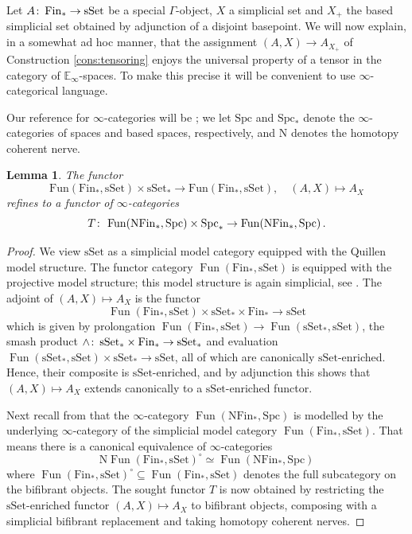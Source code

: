 \documentclass[oneside, a4paper, 12pt]{article}
\numberwithin{equation}{section}
\DeclareMathOperator{\Fun}{Fun}
\newcommand{\Spc}{\mathrm{Spc}}
\newcommand{\Fin}{\mathrm{Fin}}
\newcommand{\sset}{\mathrm{sSet}}
\newcommand{\co}{\colon\thinspace}
\theoremstyle{plain}
\newtheorem{lemma}[theorem]{Lemma}
\theoremstyle{definition}
\theoremstyle{remark}
\begin{document}
Let $A\co \Fin_\ast\to \sset$ be a special $\Gamma$-object, $X$ a simplicial set and $X_+$ the based simplicial set obtained by adjunction of a disjoint basepoint. We will now explain, in a somewhat ad hoc manner, that the assignment $(A,X)\to A_{X_+}$ of Construction \ref{cons:tensoring} enjoys the universal property of a tensor in the category of $\mathbb{E}_\infty$-spaces. To make this precise it will be convenient to use $\infty$-categorical language.

Our reference for $\infty$-categories will be \cite{HTT}; we let $\Spc$ and $\Spc_\ast$ denote the $\infty$-categories of spaces and based spaces, respectively, and $\mathrm{N}$ denotes the homotopy coherent nerve.

\begin{lemma}
The functor
\[
\mathrm{Fun}(\Fin_\ast,\sset) \times \sset_\ast\to \mathrm{Fun}(\Fin_\ast,\sset),\quad (A,X)\mapsto A_X
\]
refines to a functor of $\infty$-categories
\[
T\co \Fun(\mathrm{N}\Fin_\ast,\Spc) \times \Spc_\ast \to \Fun(\mathrm{N}\Fin_\ast,\Spc)\, .
\]
\end{lemma}
\begin{proof}
We view $\sset$ as a simplicial model category equipped with the Quillen model structure. The functor category $\Fun(\Fin_\ast,\sset)$ is equipped with the projective model structure; this model structure is again simplicial, see \cite[Section A.3.3]{HTT}. The adjoint of $(A,X)\mapsto A_X$ is the functor
\[
\Fun(\Fin_\ast,\sset)\times \sset_\ast \times \Fin_\ast  \to \sset
\]
which is given by prolongation $\Fun(\Fin_\ast,\sset)\to \Fun(\sset_\ast,\sset)$, the smash product $\wedge\co \sset_\ast \times \Fin_\ast\to \sset_\ast$ and evaluation $\Fun(\sset_\ast,\sset)\times \sset_\ast\to \sset$, all of which are canonically $\sset$-enriched. Hence, their composite is $\sset$-enriched, and by adjunction this shows that $(A,X)\mapsto A_X$ extends canonically to a $\sset$-enriched functor.

Next recall from \cite[4.2.4.4]{HTT} that the $\infty$-category $\Fun(\mathrm{N}\Fin_\ast,\Spc)$ is modelled by the underlying $\infty$-category of the simplicial model category $ \Fun(\Fin_\ast,\sset)$. That means there is a canonical equivalence of $\infty$-categories
\begin{equation} \label{eq:functorcategory}
\mathrm{N} \Fun(\Fin_\ast,\sset)^{\circ}\simeq \Fun(\mathrm{N}\Fin_\ast,\Spc)
\end{equation}
where $\Fun(\Fin_\ast,\sset)^{\circ}\subseteq \Fun(\Fin_\ast,\sset)$ denotes the full subcategory on the bifibrant objects. The sought functor $T$ is now obtained by restricting the $\sset$-enriched functor $(A,X)\mapsto A_X$ to bifibrant objects, composing with a simplicial bifibrant replacement and taking homotopy coherent nerves.
\end{proof}
\end{document}
